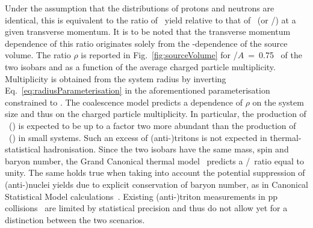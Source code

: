 \documentclass[%
 reprint,
 amsmath,amssymb,
 aps,
]{revtex4-1}
\begin{document}
\noindent Under the assumption that the distributions of protons and neutrons are identical, this is equivalent to the ratio of \tritium~yield relative to that of \hethree~(or \antitritium/\antihethree) at a given transverse momentum. It is to be noted that the transverse momentum dependence of this ratio originates solely from the \pt-dependence of the source volume. 
The ratio $\rho$ is reported in Fig.~\ref{fig:sourceVolume} for \pt/$A$~=~0.75 \GeVc~of the two isobars and as a function of the average charged particle multiplicity. Multiplicity is obtained from the system radius by inverting Eq.~\ref{eq:radiusParameterisation} in the aforementioned parameterisation constrained to \btwo.
The coalescence model predicts a dependence of $\rho$ on the system size and thus on the charged particle multiplicity. In particular, the production of \tritium~(\antitritium) is expected to be up to a factor two more abundant than the production of \hethree~(\antihethree) in small systems. Such an excess of (anti-)tritons is not expected in thermal-statistical hadronisation. Since the two isobars have the same mass, spin and baryon number, the Grand Canonical thermal model~\cite{Andronic:2010qu,Andronic:2017} predicts a \tritium/\hethree~ratio equal to unity. The same holds true when taking into account the potential suppression of \mbox{(anti-)nuclei} yields due to explicit conservation of baryon number, as in Canonical Statistical Model calculations~\cite{Vovchenko:2018fiy}.
Existing (anti-)triton measurements in pp collisions~\cite{ALICE:nucleipp2017} are limited by statistical precision and thus do not allow yet for a distinction between the two scenarios.
\end{document}
